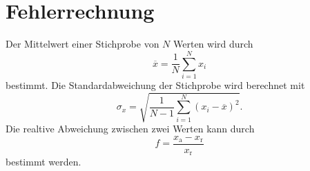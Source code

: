 \section{Fehlerrechnung}

Der Mittelwert einer Stichprobe von $N$ Werten wird durch
\begin{equation*}
    \overline{x} = \frac{1}{N} \sum_{i=1}^N x_i
    \label{eqn:mittelwert}
\end{equation*}
bestimmt.
\newline
Die Standardabweichung der Stichprobe wird berechnet mit
\begin{equation*}
    \sigma_x = \sqrt{\frac{1}{N-1} \sum_{i=1}^N (x_i - \overline{x})^2}.
    \label{eqn:standard}
\end{equation*}
\newline
Die realtive Abweichung zwischen zwei Werten kann durch
\begin{equation*}
    f = \frac{x_\text{a} - x_\text{r}}{x_\text{r}}
\end{equation*}
bestimmt werden.
